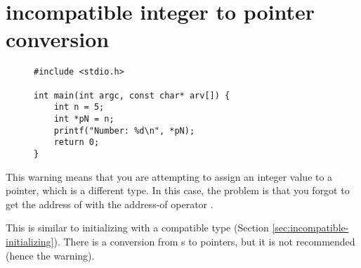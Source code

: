 \section{incompatible integer to pointer conversion}\label{sec:incompatible-conversion}

\begin{figure}
\begin{lstlisting}
#include <stdio.h>

int main(int argc, const char* arv[]) {
	int n = 5;
	int *pN = n;
	printf("Number: %d\n", *pN);
	return 0;
}
\end{lstlisting}
\label{ex:incompatible-conversion}
\end{figure}

This warning means that you are attempting to assign an integer value to a pointer, which is a different type.
In this case, the problem is that you forgot to get the address of  with the address-of operator \code{\&}.

This is similar to initializing with a compatible type (Section \ref{sec:incompatible-initializing}).
There is a conversion from s to pointers, but it is not recommended (hence the warning).

\newpage